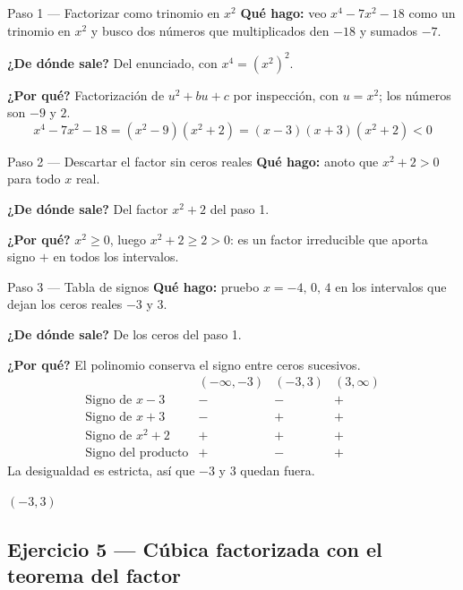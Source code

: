 \documentclass[11pt]{article}
\begin{document}
\begin{paso}{Paso 1 --- Factorizar como trinomio en $x^2$}
\textbf{Qué hago:} veo $x^4-7x^2-18$ como un trinomio en $x^2$ y busco dos números que multiplicados den $-18$ y sumados $-7$.

\textbf{¿De dónde sale?} Del enunciado, con $x^4=(x^2)^2$.

\textbf{¿Por qué?} Factorización de $u^2+bu+c$ por inspección, con $u=x^2$; los números son $-9$ y $2$.
\[
x^4-7x^2-18=(x^2-9)(x^2+2)=(x-3)(x+3)(x^2+2)<0
\]
\end{paso}

\begin{paso}{Paso 2 --- Descartar el factor sin ceros reales}
\textbf{Qué hago:} anoto que $x^2+2>0$ para todo $x$ real.

\textbf{¿De dónde sale?} Del factor $x^2+2$ del paso 1.

\textbf{¿Por qué?} $x^2\ge 0$, luego $x^2+2\ge 2>0$: es un factor irreducible que aporta signo $+$ en todos los intervalos.
\end{paso}

\begin{paso}{Paso 3 --- Tabla de signos}
\textbf{Qué hago:} pruebo $x=-4,\,0,\,4$ en los intervalos que dejan los ceros reales $-3$ y $3$.

\textbf{¿De dónde sale?} De los ceros del paso 1.

\textbf{¿Por qué?} El polinomio conserva el signo entre ceros sucesivos.
\[
\begin{array}{l|ccc}
 & (-\infty,-3) & (-3,3) & (3,\infty)\\\hline
\text{Signo de } x-3 & - & - & +\\
\text{Signo de } x+3 & - & + & +\\
\text{Signo de } x^2+2 & + & + & +\\\hline
\text{Signo del producto} & + & - & +
\end{array}
\]
La desigualdad es estricta, así que $-3$ y $3$ quedan fuera.
\end{paso}

\begin{resp}
$(-3,3)$
\end{resp}

\subsection*{Ejercicio 5 — Cúbica factorizada con el teorema del factor}
\end{document}
